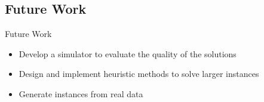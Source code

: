 
\subsection{Future Work}
\begin{frame}{Future Work}
  \begin{itemize}
  \item Develop a simulator to evaluate the quality of the solutions
  \item Design and implement heuristic methods to solve larger instances
  \item Generate instances from real data
  \end{itemize}
\end{frame}
